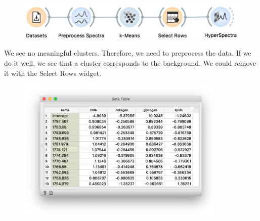 \begin{figure}
  \centering
  \includegraphics[width=1.1\textwidth]{graphics/ch-spectra_image_clustering/sp_image_clustering-fig3.png}%
  \label{fig:spectra_image_clustering-fig3}
\end{figure}
We see no meaningful clusters. Therefore, we need to preprocess the data. If we do it well, we see that a cluster corresponds to the background. We could remove it with the Select Rows widget.

\begin{figure}
  \vspace{-0.5cm}
  \includegraphics[width=0.9\textwidth]{graphics/ch-spectra_classification/sp_classification-fig4.png}
  \label{fig:spectra_classification-fig4}
\end{figure}

